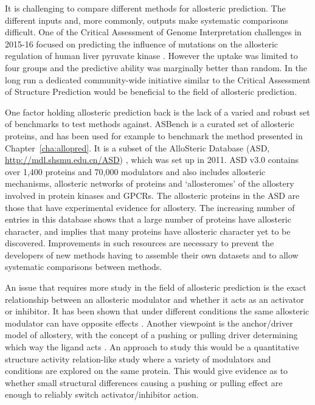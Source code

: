 It is challenging to compare different methods for allosteric prediction.
The different inputs and, more commonly, outputs make systematic comparisons difficult.
One of the Critical Assessment of Genome Interpretation challenges in 2015-16 focused on predicting the influence of mutations on the allosteric regulation of human liver pyruvate kinase \cite{Xu2017}.
However the uptake was limited to four groups and the predictive ability was marginally better than random.
In the long run a dedicated community-wide initiative similar to the Critical Assessment of Structure Prediction \cite{Moult2016} would be beneficial to the field of allosteric prediction.

One factor holding allosteric prediction back is the lack of a varied and robust set of benchmarks to test methods against.
ASBench \cite{Huang2015} is a curated set of allosteric proteins, and has been used for example to benchmark the method presented in Chapter~\ref{cha:allopred}.
It is a subset of the AlloSteric Database (ASD, \url{http://mdl.shsmu.edu.cn/ASD}) \cite{Shen2016}, which was set up in 2011.
ASD v3.0 contains over 1,400 proteins and 70,000 modulators and also includes allosteric mechanisms, allosteric networks of proteins and `allosteromes' of the allostery involved in protein kinases and GPCRs.
The allosteric proteins in the ASD are those that have experimental evidence for allostery.
The increasing number of entries in this database shows that a large number of proteins have allosteric character, and implies that many proteins have allosteric character yet to be discovered.
Improvements in such resources are necessary to prevent the developers of new methods having to assemble their own datasets \cite{Panjkovich2012, Mitternacht2011, Amor2016} and to allow systematic comparisons between methods.

An issue that requires more study in the field of allosteric prediction is the exact relationship between an allosteric modulator and whether it acts as an activator or inhibitor.
It has been shown that under different conditions the same allosteric modulator can have opposite effects \cite{Motlagh2012}.
Another viewpoint is the anchor/driver model of allostery, with the concept of a pushing or pulling driver determining which way the ligand acts \cite{Nussinov2014}.
An approach to study this would be a quantitative structure activity relation-like study where a variety of modulators and conditions are explored on the same protein.
This would give evidence as to whether small structural differences causing a pushing or pulling effect are enough to reliably switch activator/inhibitor action.

